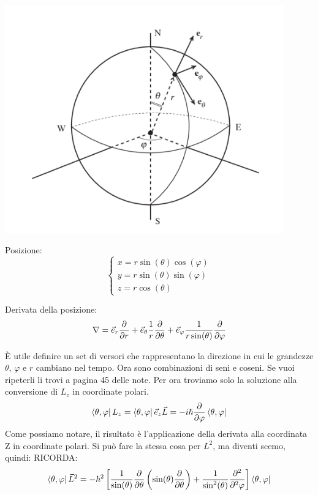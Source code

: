 \begin{minipage}{0.45\textwidth} %
    \centering
    \includegraphics[width=0.9\textwidth]{../images/Screenshot 2025-02-18 175342.png} 
    \label{fig:polar}
\end{minipage}
\hfill %
\begin{minipage}{0.45\textwidth} %
    Posizione:
	$$\left\{ \begin{array}{l}
		x = r \sin(\theta)\cos(\varphi)\\
		y = r \sin(\theta)\sin(\varphi)\\
		z = r \cos(\theta)
    \end{array} \right.$$
	\vspace{15pt}
	
	\noindent Derivata della posizione:
	$$\nabla = \vec{e}_r \frac{\partial}{\partial r} + \vec{e}_{\theta} \frac{1}{r}\frac{\partial}{\partial \theta} + \vec{e}_{\varphi} \frac{1}{r\sin(\theta)}\frac{\partial}{\partial \varphi}\\$$
\end{minipage}

\vspace{15pt}

\noindent È utile definire un set di versori che rappresentano la direzione in cui le grandezze $\theta$, $\varphi$ e $r$ cambiano nel tempo. Ora sono combinazioni di seni e coseni. Se vuoi ripeterli li trovi a pagina 45 delle note. Per ora troviamo solo la soluzione alla conversione di $L_z$ in coordinate polari. 
$$\bra{\theta, \varphi}L_z = \bra{\theta, \varphi}\vec{e}_z\vec{L} = -i\hbar \frac{\partial}{\partial \varphi} \bra{\theta, \varphi}$$
Come possiamo notare, il risultato è l'applicazione della derivata alla coordinata Z in coordinate polari. Si può fare la stessa cosa per $L^2$, ma diventi scemo, quindi: RICORDA:
$$\bra{\theta, \varphi}\vec{L}^2 = -\hbar^2 \left[\frac{1}{\sin(\theta)} \frac{\partial}{\partial \theta}\left(\sin(\theta) \frac{\partial}{\partial \theta}\right) + \frac{1}{\sin^2(\theta)} \frac{\partial^2}{\partial^2\varphi}\right]\bra{\theta, \varphi}$$
